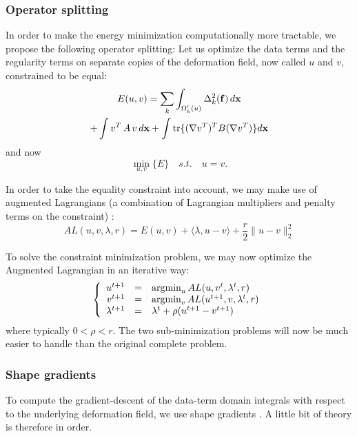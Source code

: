 \subsubsection{Operator splitting}
In order to make the energy minimization computationally more tractable, 
we propose the following operator splitting: Let us optimize the data terms 
and the regularity terms on separate copies of the deformation field, 
now called $u$ and $v$, constrained to be equal:
\begin{multline}
E(u,v) = \sum\limits_k \int_{\Omega'_k(u)} \Delta^2_k (\mathbf{f}) \,d\mathbf{x} \\
+ \int v^T \, A \, v \, d\mathbf{x} + \int \tr\{(\nabla v^T)^T B (\nabla v^T)\} d\mathbf{x}
\label{eq:operator_splitting}
\end{multline}
and now
\begin{equation}
\min_{u,v} \{ E \} \quad s.t. \quad u = v.
\end{equation}

In order to take the equality constraint into account, we may make use of 
augmented Lagrangians (a combination of Lagrangian multipliers and penalty 
terms on the constraint) \cite{bertsekas_multiplier_1976,
glowinski_augmented_1989,nocedal_numerical_2006}:
\begin{equation}
AL(u,v,\lambda,r) = E(u,v) + \langle \lambda, u-v \rangle + \frac{r}{2} \| u - v \|_2^2
\end{equation}

To solve the constraint minimization problem, we may now optimize the 
Augmented Lagrangian in an iterative way:
\begin{equation}
\left\lbrace 
\begin{array}{rcl}
u^{t+1} &=& \operatorname{argmin}_{u} AL(u,v^t,\lambda^t,r)\\
v^{t+1} &=& \operatorname{argmin}_{v} AL(u^{t+1},v,\lambda^t,r)\\
\lambda^{t+1} &=& \lambda^t + \rho(u^{t+1}-v^{t+1})
\end{array}\right.
\end{equation}
where typically $0 < \rho < r$. The two sub-minimization problems will 
now be much easier to handle than the original complete problem.

\subsubsection{Shape gradients}
To compute the gradient-descent of the data-term domain integrals with 
respect to the underlying deformation field, we use shape gradients 
\cite{jehan-besson_dream2s:_2003,herbulot_segmentation_2006}. A little 
bit of theory is therefore in order.


